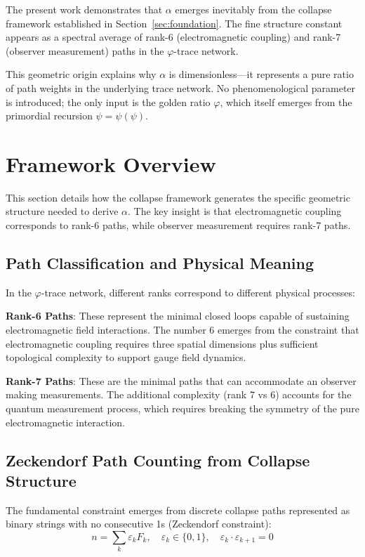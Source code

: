 \documentclass[%
 reprint,
 amsmath,amssymb,
 aps,
 prd,
 10pt,
 nofootinbib,      %
 longbibliography  %
]{revtex4-2}
\theoremstyle{definition}
\theoremstyle{remark}
\begin{document}
The present work demonstrates that $\alpha$ emerges inevitably from the collapse framework established in Section~\ref{sec:foundation}. 
The fine structure constant appears as a spectral average of rank-6 (electromagnetic coupling) and rank-7 (observer measurement) paths in the $\varphi$-trace network.

This geometric origin explains why $\alpha$ is dimensionless—it represents a pure ratio of path weights in the underlying trace network. 
No phenomenological parameter is introduced; the only input is the golden ratio $\varphi$, which itself emerges from the primordial recursion $\psi = \psi(\psi)$.

\section{Framework Overview}\label{sec:framework}

This section details how the collapse framework generates the specific geometric structure needed to derive $\alpha$. The key insight is that electromagnetic coupling corresponds to rank-6 paths, while observer measurement requires rank-7 paths.

\subsection{Path Classification and Physical Meaning}

In the $\varphi$-trace network, different ranks correspond to different physical processes:

\textbf{Rank-6 Paths}: These represent the minimal closed loops capable of sustaining electromagnetic field interactions. The number 6 emerges from the constraint that electromagnetic coupling requires three spatial dimensions plus sufficient topological complexity to support gauge field dynamics.

\textbf{Rank-7 Paths}: These are the minimal paths that can accommodate an observer making measurements. The additional complexity (rank 7 vs 6) accounts for the quantum measurement process, which requires breaking the symmetry of the pure electromagnetic interaction.

\subsection{Zeckendorf Path Counting from Collapse Structure}

The fundamental constraint emerges from discrete collapse paths represented as binary strings with no consecutive 1s (Zeckendorf constraint):
\begin{equation}
  n = \sum_k \varepsilon_k F_k, \quad \varepsilon_k \in \{0,1\}, \quad \varepsilon_k \cdot \varepsilon_{k+1} = 0
\end{equation}
\end{document}
